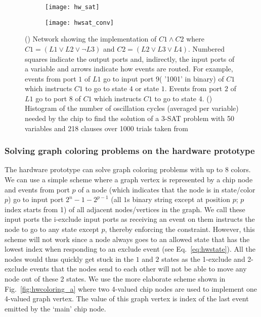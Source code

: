 \documentclass[10pt]{article}
\begin{document}
\begin{figure}[h]
 \centering
 \begin{subfigure}[b]{0.4\textwidth}
     \texttt{[image: hw\_sat]} 
     \subcaption{}
     \label{fig:hwsat_a}
   \end{subfigure}
   \quad
   \begin{subfigure}[b]{0.5\textwidth}
     \texttt{[image: hwsat\_conv]} 
     \subcaption{}
     \label{fig:hwsat_b}
   \end{subfigure}


   \caption{() Network showing the implementation of $C1 \wedge C2$ where $C1 = (L1 \vee L2 \vee \neg L3)$ and $C2 = (L2 \vee L3 \vee L4)$. Numbered squares indicate the output ports and, indirectly, the input ports of a variable and arrows indicate how events are routed. For example, events from port $1$ of $L1$ go to input port $9$( '1001' in binary) of $C1$ which instructs $C1$ to go to state $4$ or state $1$. Events from port $2$ of $L1$ go to port $8$ of $C1$ which instructs $C1$ to go to state $4$. () Histogram of the number of oscillation cycles (averaged per variable) needed by the chip to find the solution of a 3-SAT problem with 50 variables and 218 clauses over 1000 trials taken from \cite{Hoos_Stutzle98}}
\label{fig:hwsat}
\end{figure}	





\subsubsection*{Solving graph coloring problems on the hardware prototype}
The hardware prototype can solve graph coloring problems with up to 8 colors. We can use a simple scheme where a graph vertex is represented by a chip node and events from port $p$ of a node (which indicates that the node is in state/color $p$) go to input port $2^n-1-2^{p-1}$ (all $1$s binary string except at position $p$; $p$ index starts from 1) of all adjacent nodes/vertices in the graph. We call these input ports the i-exclude input ports as receiving an event on them instructs the node to go to any state except $p$, thereby enforcing the constraint. However, this scheme will not work since a node always goes to an allowed state that has the lowest index when responding to an exclude event (see Eq.~\ref{eq:hwstate}). All the nodes would thus quickly get stuck in the $1$ and $2$ states as the 1-exclude and 2-exclude events that the nodes send to each other will not be able to move any node out of these 2 states. We use the more elaborate scheme shown in Fig.~\ref{fig:hwcoloring_a} where two 4-valued chip nodes are used to implement one 4-valued graph vertex. The value of this graph vertex is index of the last event emitted by the `main' chip node. 
\end{document}
